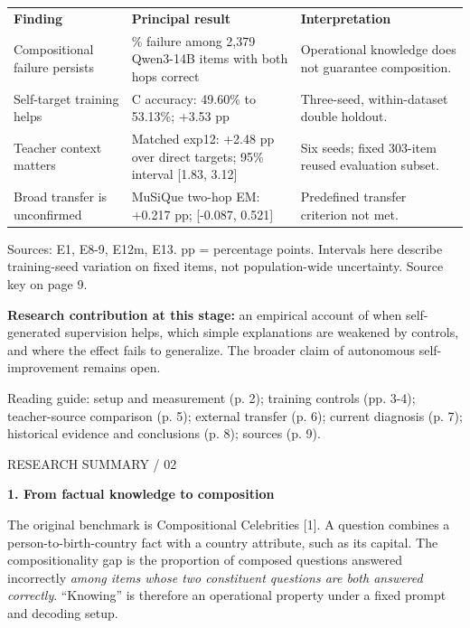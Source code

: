 \documentclass[11pt,a4paper]{article}
\newcommand{\reportheading}[1]{\par\vspace{5pt}{\color{teal}\bfseries\large #1}\par\vspace{2pt}}
\newcommand{\reporttitle}[1]{{\fontsize{20}{24}\selectfont\bfseries #1}\par\vspace{8pt}}
\begin{document}
{\small
\begin{tabular}{>{\raggedright\arraybackslash}p{}>{\raggedright\arraybackslash}p{}>{\raggedright\arraybackslash}p{}}
\rowcolor{navy}
\color{white}\bfseries Finding & \color{white}\bfseries Principal result & \color{white}\bfseries Interpretation \\
\rowcolor{pale}
Compositional failure persists & 33.80\% failure among 2,379 Qwen3-14B items with both hops correct & Operational knowledge does not guarantee composition. \\
Self-target training helps & C accuracy: 49.60\% to 53.13\%; +3.53 pp & Three-seed, within-dataset double holdout. \\
\rowcolor{pale}
Teacher context matters & Matched exp12: +2.48 pp over direct targets; 95\% interval [1.83, 3.12] & Six seeds; fixed 303-item reused evaluation subset. \\
Broad transfer is unconfirmed & MuSiQue two-hop EM: +0.217 pp; [-0.087, 0.521] & Predefined transfer criterion not met. \\
\end{tabular}
}\par\smallskip
{\small\color{muted} Sources: E1, E8-9, E12m, E13. pp = percentage points. Intervals here describe training-seed variation on fixed items, not population-wide uncertainty. Source key on page 9.\par}
\par\smallskip\noindent\colorbox{pale}{\parbox{\dimexpr\linewidth-2\fboxsep\relax}{\textbf{Research contribution at this stage:} an empirical account of when self-generated supervision helps, which simple explanations are weakened by controls, and where the effect fails to generalize. The broader claim of autonomous self-improvement remains open.}}\par\smallskip
{\small\color{muted} Reading guide: setup and measurement (p. 2); training controls (pp. 3-4); teacher-source comparison (p. 5); external transfer (p. 6); current diagnosis (p. 7); historical evidence and conclusions (p. 8); sources (p. 9).\par}

\clearpage
{\small\color{muted} RESEARCH SUMMARY / 02\par}
\reporttitle{1. From factual knowledge to composition}
\reportheading{Task and training method}
The original benchmark is Compositional Celebrities [1]. A question combines a person-to-birth-country fact with a country attribute, such as its capital. The compositionality gap is the proportion of composed questions answered incorrectly \textit{among items whose two constituent questions are both answered correctly}. ``Knowing'' is therefore an operational property under a fixed prompt and decoding setup.
\end{document}
